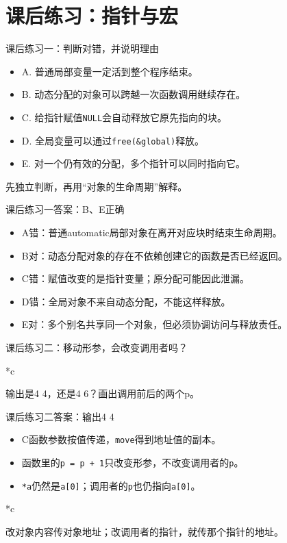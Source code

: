 \section{课后练习：指针与宏}

\begin{frame}{课后练习一：判断对错，并说明理由}
\begin{itemize}
\item A. 普通局部变量一定活到整个程序结束。
\item B. 动态分配的对象可以跨越一次函数调用继续存在。
\item C. 给指针赋值\texttt{NULL}会自动释放它原先指向的块。
\item D. 全局变量可以通过\texttt{free(\&global)}释放。
\item E. 对一个仍有效的分配，多个指针可以同时指向它。
\end{itemize}
\medskip\alert{先独立判断，再用“对象的生命周期”解释。}
\end{frame}

\begin{frame}{课后练习一答案：B、E正确}
\begin{itemize}
\item A错：普通automatic局部对象在离开对应块时结束生命周期。
\item B对：动态分配对象的存在不依赖创建它的函数是否已经返回。
\item C错：赋值改变的是指针变量；原分配可能因此泄漏。
\item D错：全局对象不来自动态分配，不能这样释放。
\item E对：多个别名共享同一个对象，但必须协调访问与释放责任。
\end{itemize}

\end{frame}

\begin{frame}{课后练习二：移动形参，会改变调用者吗？}
\begin{Code}*{c}\end{Code}\alert{输出是4 4，还是4 6？画出调用前后的两个p。}
\end{frame}

\begin{frame}{课后练习二答案：输出4 4}
\begin{itemize}
\item C函数参数按值传递，\texttt{move}得到地址值的副本。
\item 函数里的\texttt{p = p + 1}只改变形参，不改变调用者的\texttt{p}。
\item \texttt{*a}仍然是\texttt{a[0]}；调用者的\texttt{p}也仍指向\texttt{a[0]}。
\end{itemize}
\begin{Code}*{c}\end{Code}\alert{改对象内容传对象地址；改调用者的指针，就传那个指针的地址。}
\end{frame}


